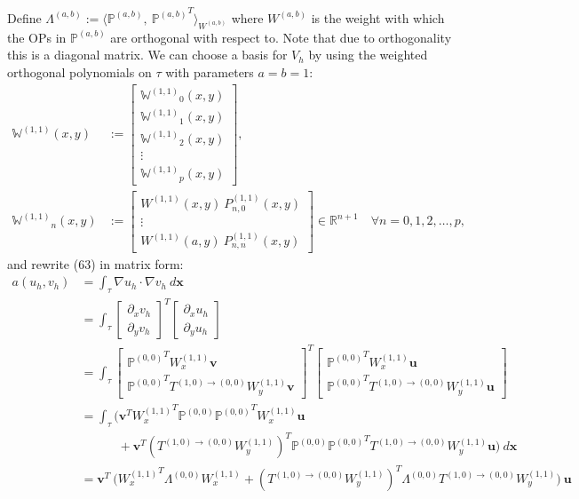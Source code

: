 \documentclass[11pt, oneside]{article}   	%
\newcommand{\R}{\mathbb{R}}
\newcommand{\bigP}{\mathbb{P}}
\newcommand{\Wii}{W^{(1,1)}}
\newcommand{\Pii}{P^{(1,1)}}
\newcommand{\bigPoo}{{\mathbb{P}^{(0,0)}}}
\newcommand{\element}{\tau}
\newcommand{\bigWii}{{\mathbb{W}^{(1,1)}}}
\begin{document}
Define $\Lambda^{(a,b)} := \langle \bigP^{(a,b)}, \: {\bigP^{(a,b)}}^T \rangle_{W^{(a,b)}}$ where $W^{(a,b)}$ is the weight with which the OPs in $\bigP^{(a,b)}$ are orthogonal with respect to. Note that due to orthogonality this is a diagonal matrix. We can choose a basis for $V_h$ by using the weighted orthogonal polynomials on $\element$ with parameters $a = b = 1$:
\begin{align}
\bigWii(x,y) &:= \begin{bmatrix}
		\bigWii_0(x,y) \\
		\hline
		\bigWii_1(x,y) \\
		\hline
		\bigWii_2(x,y) \\
		\hline
		\vdots \\
		\hline
		\bigWii_p(x,y)
	\end{bmatrix}, \\
\bigWii_n(x,y) &:= \begin{bmatrix}
		\Wii(x,y) \: \Pii_{n,0}(x,y) \\
		\vdots \\
		\Wii(a,y) \: \Pii_{n,n}(x,y)
	\end{bmatrix} \in \R^{n+1} \quad \forall n = 0,1,2,\dots,p,
\end{align}
and rewrite (63) in matrix form:
\begin{align}
	a(u_h,v_h) &= \int_\element \nabla u_h \cdot \nabla v_h \: d\mathbf{x} \\
	&= \int_\element \begin{bmatrix}
					\partial_x v_h \\
					\partial_y v_h
				\end{bmatrix}^T 
				\begin{bmatrix}
					\partial_x u_h \\
					\partial_y u_h
				\end{bmatrix}
				\\
	&= \int_\element \begin{bmatrix}
					\bigPoo^T \Wii_x \mathbf{v} \\
					\bigPoo^T T^{(1,0)\to(0,0)} \Wii_y \mathbf{v}
				\end{bmatrix}^T 
				\begin{bmatrix}
					\bigPoo^T \Wii_x \mathbf{u} \\
					\bigPoo^T T^{(1,0)\to(0,0)} \Wii_y \mathbf{u}
				\end{bmatrix}
				\\
	&= \int_\element \Big( \mathbf{v}^T {\Wii_x}^T \bigPoo \bigPoo^T \Wii_x \mathbf{u} \nonumber \\
					& \quad \quad \quad + \mathbf{v}^T ({T^{(1,0)\to(0,0)} \Wii_y})^T \bigPoo \bigPoo^T T^{(1,0)\to(0,0)} \Wii_y \mathbf{u}  \Big) \: d\mathbf{x} \\
	&= \mathbf{v}^T \: \Big( {\Wii_x}^T \Lambda^{(0,0)} \Wii_x + ({T^{(1,0)\to(0,0)} \Wii_y})^T \Lambda^{(0,0)} T^{(1,0)\to(0,0)} \Wii_y \Big) \: \mathbf{u}
\end{align}
\end{document}
